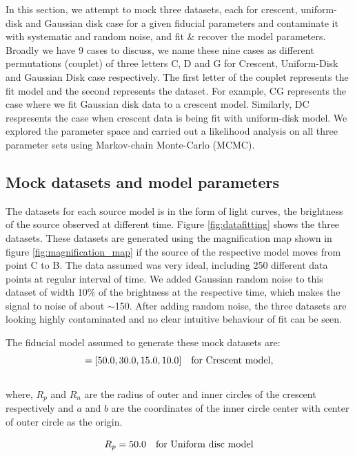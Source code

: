 In this section, we attempt to mock three datasets, each for crescent, uniform-disk and Gaussian disk case for a given fiducial parameters and contaminate it with systematic and random noise, and fit \& recover the model parameters. Broadly we have 9 cases to discuss, we name these nine cases as different permutations (couplet) of three letters C, D and G for Crescent, Uniform-Disk and Gaussian Disk case respectively. The first letter of the couplet represents the fit model and the second represents the dataset. For example, CG represents the case where we fit Gaussian disk data to a crescent model. Similarly, DC respresents the case when crescent data is being fit with uniform-disk model. We explored the parameter space and carried out a likelihood analysis on all three parameter sets using Markov-chain Monte-Carlo (MCMC).

\subsection{Mock datasets and model parameters}
The datasets for each source model is in the form of light curves, the brightness of the source observed at different time. Figure \ref{fig:datafitting} shows the three datasets. These datasets are generated using the magnification map shown in figure \ref{fig:magnification_map} if the source of the respective model moves from point C to B. The data assumed was very  ideal, including 250 different data points at regular interval of time. We added Gaussian random noise to this dataset of width 10\% of the brightness at the respective time, which makes the signal to noise of about $\sim$150. After adding random noise, the three datasets are looking highly contaminated and no clear intuitive behaviour of fit can be seen. 

The fiducial model assumed to generate these mock datasets are:
\begin{equation}
	[R_p, R_n, a, b] = [50.0, 30.0, 15.0, 10.0]  \ \ \ \rm{for\ Crescent\ model},
	\label{eqn:cp}
\end{equation}
\\
where, $R_p$ and $R_n$ are the radius of outer and inner circles of the crescent respectively and $a$ and $b$ are the coordinates of the inner circle center with center of outer circle as the origin.

\begin{equation}
	R_p = 50.0 \ \ \ \rm{for\ Uniform\ disc\ model}
\end{equation}

